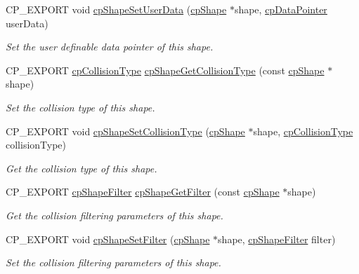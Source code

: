 \begin{DoxyCompactItemize}
\mbox{\label{group__cpShape_ga1de05153aca70a3c61c454707c89813e}} 
C\+P\+\_\+\+E\+X\+P\+O\+RT void \hyperlink{group__cpShape_ga1de05153aca70a3c61c454707c89813e}{cp\+Shape\+Set\+User\+Data} (\hyperlink{structcpShape}{cp\+Shape} $\ast$shape, \hyperlink{group__basicTypes_ga2ac2c3c31e21893941f9e4f8ee279447}{cp\+Data\+Pointer} user\+Data)
\begin{DoxyCompactList}\small\item\em Set the user definable data pointer of this shape. \end{DoxyCompactList}\item 
\mbox{\label{group__cpShape_gae1f59960451b5324c2d1992ba9023c5b}} 
C\+P\+\_\+\+E\+X\+P\+O\+RT \hyperlink{group__basicTypes_gae83e2f50965eb441e36ffff1e32e6d02}{cp\+Collision\+Type} \hyperlink{group__cpShape_gae1f59960451b5324c2d1992ba9023c5b}{cp\+Shape\+Get\+Collision\+Type} (const \hyperlink{structcpShape}{cp\+Shape} $\ast$shape)
\begin{DoxyCompactList}\small\item\em Set the collision type of this shape. \end{DoxyCompactList}\item 
\mbox{\label{group__cpShape_ga9c7e4dbae5ea13116d7ebb85eded14d6}} 
C\+P\+\_\+\+E\+X\+P\+O\+RT void \hyperlink{group__cpShape_ga9c7e4dbae5ea13116d7ebb85eded14d6}{cp\+Shape\+Set\+Collision\+Type} (\hyperlink{structcpShape}{cp\+Shape} $\ast$shape, \hyperlink{group__basicTypes_gae83e2f50965eb441e36ffff1e32e6d02}{cp\+Collision\+Type} collision\+Type)
\begin{DoxyCompactList}\small\item\em Get the collision type of this shape. \end{DoxyCompactList}\item 
\mbox{\label{group__cpShape_ga9f6fa02cd5ca57dacaa8400c0585137b}} 
C\+P\+\_\+\+E\+X\+P\+O\+RT \hyperlink{structcpShapeFilter}{cp\+Shape\+Filter} \hyperlink{group__cpShape_ga9f6fa02cd5ca57dacaa8400c0585137b}{cp\+Shape\+Get\+Filter} (const \hyperlink{structcpShape}{cp\+Shape} $\ast$shape)
\begin{DoxyCompactList}\small\item\em Get the collision filtering parameters of this shape. \end{DoxyCompactList}\item 
\mbox{\label{group__cpShape_gaf7e77e7de50960b9aecf627706a5e747}} 
C\+P\+\_\+\+E\+X\+P\+O\+RT void \hyperlink{group__cpShape_gaf7e77e7de50960b9aecf627706a5e747}{cp\+Shape\+Set\+Filter} (\hyperlink{structcpShape}{cp\+Shape} $\ast$shape, \hyperlink{structcpShapeFilter}{cp\+Shape\+Filter} filter)
\begin{DoxyCompactList}\small\item\em Set the collision filtering parameters of this shape. \end{DoxyCompactList}\end{DoxyCompactItemize}


